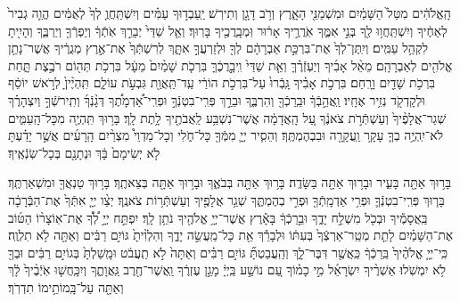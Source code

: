 \documentclass[twoside, openany, parskip=half, 11pt]{book}
\begin{document}
 הָֽאֱלֹהִ֔ים מִטַּל֙ הַשָּׁמַ֔יִם וּמִשְׁמַנֵּ֖י הָאָ֑רֶץ וְרֹ֥ב דָּגָ֖ן וְתִירֽשׁ׃ יַֽעַבְד֣וּךָ עַמִּ֗ים וְיִשְׁתַּֽחֲוֻ֤ לְךָ֙ לְאֻמִּ֔ים הֱוֵ֤ה גְבִיר֙ לְאַחֶ֔יךָ וְיִשְׁתַּֽחֲו֥וּ לְ֖ךָ בְּנֵ֣י אִמֶּ֑ךָ אֹֽרֲרֶ֣יךָ אָר֔וּר וּֽמְבָֽרֲכֶ֖יךָ בָּרֽוּךְ׃ וְאֵ֤ל שַׁדַּי֙ יְבָרֵ֣ךְ אֹֽתְֿךָ֔ וְיַפְרְֿךָ֖ וְיַרְבֶּ֑ךָ וְהָיִ֖יתָ לִקְהַ֥ל עַמִּֽים׃ וְיִֽתֶּן־לְךָ֙ אֶת־בִּרְכַּ֣ת אַבְרָהָ֔ם לְךָ֖ וּלְזַרְעֲךָ֣ אִתָּ֑ךְ לְרִשְׁתְּֿךָ֙ אֶת־אֶ֣רֶץ מְגֻרֶ֔יךָ אֲשֶׁר־נָתַ֥ן אֱלֹהִ֖ים לְאַבְרָהָֽם׃ מֵאֵ֨ל אָבִ֜יךָ וְיַעְזְֿרֶ֗ךָּ וְאֵ֤ת שַׁדַּי֙ וִֽיבָ֣רֲכֶ֔ךָּ בִּרְכֹ֤ת שָׁמַ֨יִם֙ מֵעָ֔ל בִּרְכֹ֥ת תְּה֖וֹם רֹבֶ֣צֶת תָּ֑חַת בִּרְכֹ֥ת שָׁדַ֖יִם וָרָֽחַם׃ בִּרְכֹ֣ת אָבִ֗יךָ גָּֽבְֿרוּ֙ עַל־בִּרְכֹ֣ת הוֹרַ֔י עַֽד־תַּֽאֲוַ֖ת גִּבְעֹ֣ת עוֹלָ֑ם תִּֽהְיֶ֨יןָ֙ לְרֹ֣אשׁ יוֹסֵ֔ף וּלְקָדְקֹ֖ד נְזִ֥יר אֶחָֽיו׃ 
 וַֽאֲהֵ֣בְֿךָ֔ וּבֵֽרַכְֿךָ֖ וְהִרְבֶּ֑ךָ וּבֵרַ֣ךְ פְּרִֽי־בִטְנְֿךָ֣ וּפְרִֽי־אַ֠דְמָתֶ֠ךָ דְּגָ֨נְֿךָ֜ וְתִֽירשְֿׁךָ֣ וְיִצְהָרֶ֗ךָ שְׁגַר־אֲלָפֶ֨יךָ֙ וְעַשְׁתְּֿרֹ֣ת צֹאנֶ֔ךָ עַ֚ל הָֽאֲדָמָ֔ה אֲשֶׁר־נִשְׁבַּ֥ע לַֽאֲבֹתֶ֖יךָ לָ֥תֶת לָֽךְ׃ בָּר֥וּךְ תִּֽהְיֶ֖ה מִכָּל־הָֽעַמִּ֑ים לֹא־יִֽהְיֶ֥ה בְךָ֛ עָקָ֥ר וַֽעֲקָרָ֖ה וּבִבְהֶמְתֶּֽךָ׃ וְהֵסִ֧יר יְיָ֛ מִמְּֿךָ֖ כָּל־חֹ֑לִי וְכָל־מַדְוֵי֩ מִצְרַ֨יִם הָֽרָעִ֜ים אֲשֶׁ֣ר יָדַ֗עְתָּ לֹ֤א יְשִׂימָם֙ בָּ֔ךְ וּנְתָנָ֖ם בְּכָל־שֽׂנְֿאֶֽיךָ׃
 
בָּר֥וּךְ אַתָּ֖ה בָּעִ֑יר וּבָר֥וּךְ אַתָּ֖ה בַּשָּׂדֶֽה׃ בָּר֥וּךְ אַתָּ֖ה בְּבֹאֶ֑ךָ וּבָר֥וּךְ אַתָּ֖ה בְּצֵאתֶֽךָ׃ בָּר֥וּךְ טַנְאֲךָ֖ וּמִשְׁאַרְתֶּֽךָ׃ בָּר֧וּךְ פְּרִֽי־בִטְנְֿךָ֛ וּפְרִ֥י אַדְמָֽתְֿךָ֖ וּפְרִ֣י בְהֶמְתֶּ֑ךָ שְׁגַ֥ר אֲלָפֶ֖יךָ וְעַשְׁתְּֿר֥וֹת צֹאנֶֽךָ׃ יְצַ֨ו יְיָ֤ אִתְּֿךָ֙ אֶת־הַבְּֿרָכָ֔ה בַּֽאֲסָמֶ֕יךָ וּבְכֹ֖ל מִשְׁלַ֣ח יָדֶ֑ךָ וּבֵ֣רַכְֿךָ֔ בָּאָ֕רֶץ אֲשֶׁר־יְיָ֥ אֱלֹהֶ֖יךָ נֹתֵ֥ן לָֽךְ׃ יִפְתַּ֣ח יְיָ֣ לְ֠ךָ֠ אֶת־אֽוֹצָר֨וֹ הַטּ֜וֹב אֶת־הַשָּׁמַ֗יִם לָתֵ֤ת מְטַֽר־אַרְצְֿךָ֙ בְּעִתּ֔וֹ וּלְבָרֵ֕ךְ אֵ֖ת כָּל־מַֽעֲשֵׂ֣ה יָדֶ֑ךָ וְהִלְוִ֨יתָ֙ גּוֹיִ֣ם רַבִּ֔ים וְאַתָּ֖ה לֹ֥א תִלְוֶֽה׃ כִּֽי־יְיָ֤ אֱלֹהֶ֨יךָ֙ בֵּֽרַכְֿךָ֔ כַּֽאֲשֶׁ֖ר דִּבֶּר־לָ֑ךְ וְהַֽעֲבַטְתָּ֞ גּוֹיִ֣ם רַבִּ֗ים וְאַתָּה֙ לֹ֣א תַֽעֲבֹ֔ט וּמָֽשַׁלְתָּ֙ בְּגוֹיִ֣ם רַבִּ֔ים וּבְךָ֖ לֹ֥א יִמְשֹֽׁלוּ׃ 
 אַשְׁרֶ֨יךָ יִשְׂרָאֵ֜ל מִ֣י כָמ֗וֹךָ עַ֚ם נוֹשַׁ֣ע בַּֽיְיָ֔ מָגֵ֣ן עֶזְרֶ֔ךָ וַֽאֲשֶׁר־חֶ֖רֶב גַּֽאֲוָתֶ֑ךָ וְיִכָּֽחֲשׁ֤וּ אֹֽיְֿבֶ֨יךָ֙ לָ֔ךְ וְאַתָּ֖ה עַל־בָּֽמוֹתֵ֥ימוֹ תִדְרֹֽךְ׃
\end{document}
